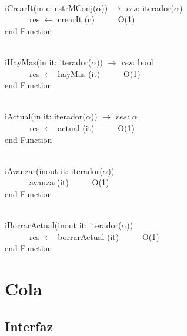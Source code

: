 \documentclass[a4paper,10pt]{article}
\begin{document}
\begin{algoritmo}
\caption{}\\
  iCrearIt(in c: estrMConj($\alpha$)) $\rightarrow$ $res$: iterador($\alpha$) \\
	\indent \ \ \ \ \ \  res $\gets$ crearIt (c)  \ \ \ \ \ O(1)\\
   end Function 
\end{algoritmo}

\begin{algoritmo}
\caption{}\\
 iHayMas(in it: iterador($\alpha$)) $\rightarrow$ $res$: bool \ \ \ \ \ \\
	\indent \ \ \ \ \ \  res $\gets$ hayMas (it)  \ \ \ \ \ O(1)\\
   end Function 
\end{algoritmo}

\begin{algoritmo}
\caption{}\\
 iActual(in it: iterador($\alpha$)) $\rightarrow$ $res$: $\alpha$ \ \ \ \ \ \\
	\indent \ \ \ \ \ \  res $\gets$ actual (it)  \ \ \ \ \ O(1)\\
   end Function 
\end{algoritmo}

\begin{algoritmo}
\caption{}\\
 iAvanzar(inout it: iterador($\alpha$)) \ \ \ \ \ \\
	\indent \ \ \ \ \ \  avanzar(it) \ \ \ \ \ O(1)\\
   end Function 
\end{algoritmo}


\begin{algoritmo}
\caption{}\\
 iBorrarActual(inout it: iterador($\alpha$)) \ \ \ \ \ \\
	\indent \ \ \ \ \ \  res $\gets$ borrarActual (it)  \ \ \ \ \ O(1)\\
   end Function 
\end{algoritmo}

\newpage

\section{Cola}

\subsection{Interfaz}
\end{document}
